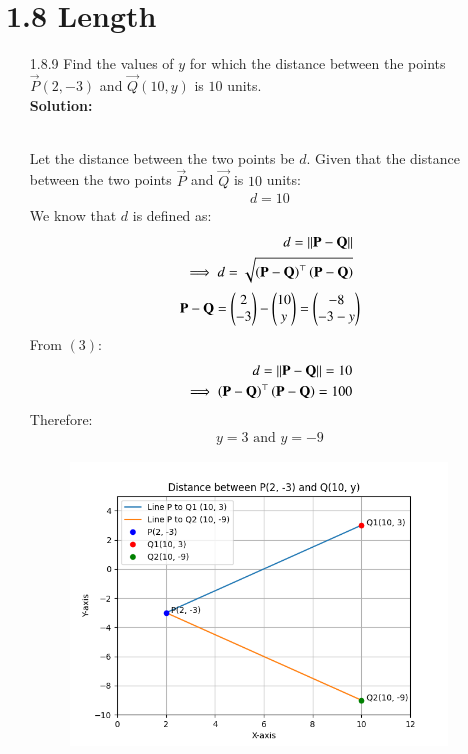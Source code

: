\documentclass[journal]{IEEEtran}
\begin{document}
\section{1.8 Length}
\begin{enumerate}
\item [1.8.9] Find the values of $y$ for which the distance between the points $\vec{P}(2, -3)$ and $\vec{Q}(10, y)$ is $10$ units.\\
\textbf{Solution:}
\begin{table}[h!]    
      \centering
      
      \caption{}
    \end{table}\\
Let the distance between the two points be $d$.
Given that the distance between the two points $\vec{P}$ and $\vec{Q}$ is $10$ units:
\begin{align}
    d=10
\end{align}
We know that $d$ is defined as:
\begin{align}
    d = \left\vert\left\vert\mathbf{P}-\mathbf{Q}\right\vert\right\vert\\
    \implies d = \sqrt{{\left(\mathbf{P}-\mathbf{Q}\right)}^\top\left(\mathbf{P}-\mathbf{Q}\right)}
\end{align}
\begin{align}
    \mathbf{P} - \mathbf{Q} = \begin{pmatrix}2\\-3\end{pmatrix} - \begin{pmatrix}10\\y\end{pmatrix} = \begin{pmatrix}-8\\-3-y\end{pmatrix}\\
\end{align}
From $(3)$:
\begin{align}
    d = \left\vert\left\vert\mathbf{P}-\mathbf{Q}\right\vert\right\vert = 10\\
    \implies {\ensuremath{\left(\mathbf{P}-\mathbf{Q}\right)}}^\top\left(\mathbf{P}-\mathbf{Q}\right) = 100
\end{align}
Therefore:
\begin{align}
    y = 3 \text{ and } y = -9
\end{align}
\begin{figure}[htp]
    \centering
    \includegraphics[width=10cm]{figs/figure.png}
    \label{fig:figure}
\end{figure}
\end{enumerate}
\end{document}

